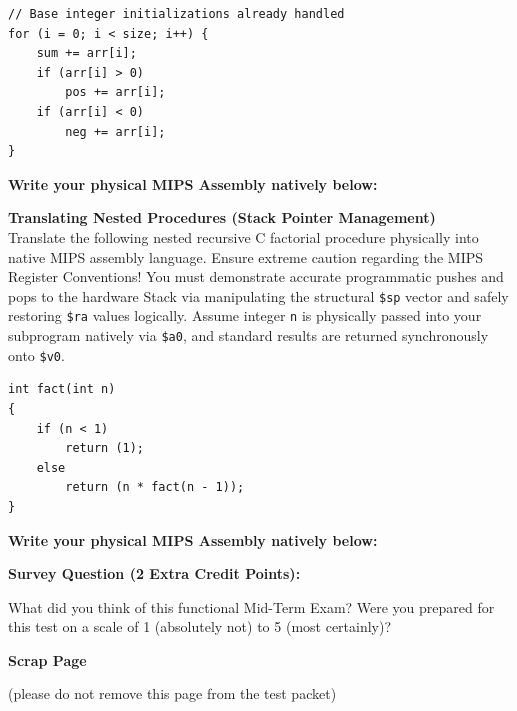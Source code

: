 \documentclass[letterpaper]{report}
\begin{document}
\begin{center}
\lstset{language=C,basicstyle=\ttfamily, numbers=none, gobble=0}
\begin{lstlisting}[frame=single]
// Base integer initializations already handled
for (i = 0; i < size; i++) {
    sum += arr[i];
    if (arr[i] > 0)
        pos += arr[i];
    if (arr[i] < 0)
        neg += arr[i];
}
\end{lstlisting}
\end{center}

\vspace{0.2in}
\textbf{Write your physical MIPS Assembly natively below:}
\ep
\vf
\newpage

%
 {\bf Translating Nested Procedures (Stack Pointer Management)} \\
Translate the following nested recursive C factorial procedure physically into native MIPS assembly language. Ensure extreme caution regarding the MIPS Register Conventions! You must demonstrate accurate programmatic pushes and pops to the hardware Stack via manipulating the structural \texttt{\$sp} vector and safely restoring \texttt{\$ra} values logically. Assume integer \texttt{n} is physically passed into your subprogram natively via \texttt{\$a0}, and standard results are returned synchronously onto \texttt{\$v0}.

\begin{center}
\lstset{language=C,basicstyle=\ttfamily, numbers=none, gobble=0}
\begin{lstlisting}[frame=single]
int fact(int n)
{
    if (n < 1)
        return (1);
    else
        return (n * fact(n - 1));
}
\end{lstlisting}
\end{center}

\vspace{0.2in}
\textbf{Write your physical MIPS Assembly natively below:}

\ep
\vf
\newpage


{\large \bf Survey Question (2 Extra Credit Points):}

\vspace{0.5in}
What did you think of this functional Mid-Term Exam? Were you prepared for this test on a scale of 1 (absolutely not) to 5 (most certainly)?

\pg


{\large \bf Scrap Page}

(please do not remove this page from the test packet)
\pg


\showpoints
\end{document}
